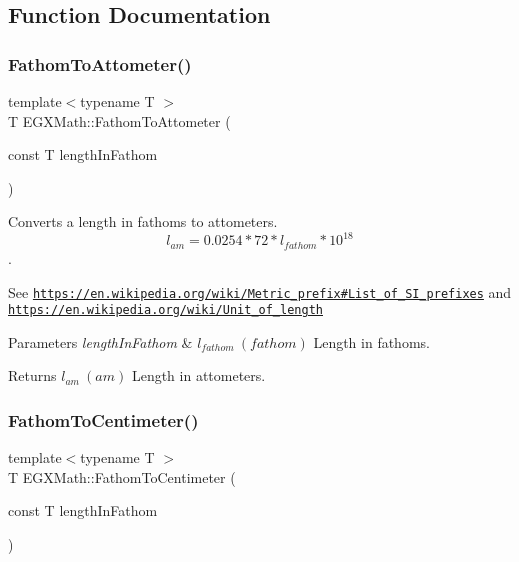 \subsection{Function Documentation}
\mbox{\label{group___e_g_x_math-_conversions-_length_conversions-_imperial-_fathom-_s_i_ga9cc357e26a4f582c83487932d82e09cb}} 
\subsubsection{\texorpdfstring{Fathom\+To\+Attometer()}{FathomToAttometer()}}
{\footnotesize\ttfamily template$<$typename T $>$ \\
T E\+G\+X\+Math\+::\+Fathom\+To\+Attometer (\begin{DoxyParamCaption}\item[{const T}]{length\+In\+Fathom }\end{DoxyParamCaption})}



Converts a length in fathoms to attometers. \[ l_{am}=0.0254 * 72 * l_{fathom} * 10^{18} \]. 

See \href{https://en.wikipedia.org/wiki/Metric_prefix#List_of_SI_prefixes}{\tt https\+://en.\+wikipedia.\+org/wiki/\+Metric\+\_\+prefix\#\+List\+\_\+of\+\_\+\+S\+I\+\_\+prefixes} and \href{https://en.wikipedia.org/wiki/Unit_of_length}{\tt https\+://en.\+wikipedia.\+org/wiki/\+Unit\+\_\+of\+\_\+length} 
\begin{DoxyParams}{Parameters}
{\em length\+In\+Fathom} & $ l_{fathom}\ (fathom)$ Length in fathoms. \\
\hline
\end{DoxyParams}
\begin{DoxyReturn}{Returns}
$ l_{am}\ (am)$ Length in attometers. 
\end{DoxyReturn}
\mbox{\label{group___e_g_x_math-_conversions-_length_conversions-_imperial-_fathom-_s_i_ga3995ded9e8a94c2d7059dd148954b46c}} 
\subsubsection{\texorpdfstring{Fathom\+To\+Centimeter()}{FathomToCentimeter()}}
{\footnotesize\ttfamily template$<$typename T $>$ \\
T E\+G\+X\+Math\+::\+Fathom\+To\+Centimeter (\begin{DoxyParamCaption}\item[{const T}]{length\+In\+Fathom }\end{DoxyParamCaption})}



